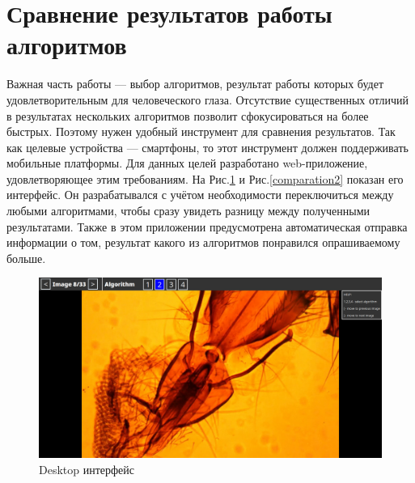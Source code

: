 \documentclass[14pt]{matmex-diploma-custom}
\begin{document}
\section{Сравнение результатов работы алгоритмов}

Важная часть работы --- выбор алгоритмов, результат работы которых будет удовлетворительным для человеческого глаза. Отсутствие существенных отличий в результатах нескольких алгоритмов позволит сфокусироваться на более быстрых. Поэтому нужен удобный инструмент для сравнения результатов. Так как целевые устройства --- смартфоны, то этот инструмент должен поддерживать мобильные платформы. Для данных целей разработано web-приложение, удовлетворяющее этим требованиям. На Рис.\ref{comparation1} и Рис.\ref{comparation2} показан его интерфейс. Он разрабатывался с учётом необходимости переключиться между любыми алгоритмами, чтобы сразу увидеть разницу между полученными результатами. Также в этом приложении предусмотрена автоматическая отправка информации о том, результат какого из алгоритмов понравился опрашиваемому больше. 

\begin{figure}[h]
    \centering
    \includegraphics[width=1.0\textwidth]{figures/comparasion1.jpg}
    \caption{Desktop интерфейс}
    \label{comparation1}
\end{figure}

\newpage
\end{document}
